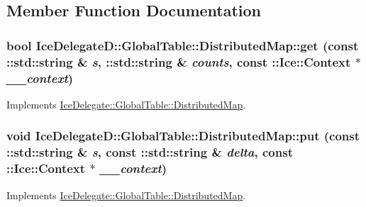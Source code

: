 \subsection{Member Function Documentation}
\hypertarget{class_ice_delegate_d_1_1_global_table_1_1_distributed_map_a2c00fdcff0ef06199ba8f881b6892cbd}{
\subsubsection[{get}]{\setlength{\rightskip}{0pt plus 5cm}bool IceDelegateD::GlobalTable::DistributedMap::get (const ::std::string \& {\em s}, \/  ::std::string \& {\em counts}, \/  const ::Ice::Context $\ast$ {\em \_\-\_\-context})}}
\label{class_ice_delegate_d_1_1_global_table_1_1_distributed_map_a2c00fdcff0ef06199ba8f881b6892cbd}


Implements \hyperlink{class_ice_delegate_1_1_global_table_1_1_distributed_map_a024ac1e825e6c918e191bcf737b0a190}{IceDelegate::GlobalTable::DistributedMap}.

\hypertarget{class_ice_delegate_d_1_1_global_table_1_1_distributed_map_afd949ed4d3a1bfa7e2313ae3379f6ac3}{
\subsubsection[{put}]{\setlength{\rightskip}{0pt plus 5cm}void IceDelegateD::GlobalTable::DistributedMap::put (const ::std::string \& {\em s}, \/  const ::std::string \& {\em delta}, \/  const ::Ice::Context $\ast$ {\em \_\-\_\-context})}}
\label{class_ice_delegate_d_1_1_global_table_1_1_distributed_map_afd949ed4d3a1bfa7e2313ae3379f6ac3}


Implements \hyperlink{class_ice_delegate_1_1_global_table_1_1_distributed_map_a145c6fd07b6d19f68f28414f0ae972f5}{IceDelegate::GlobalTable::DistributedMap}.

